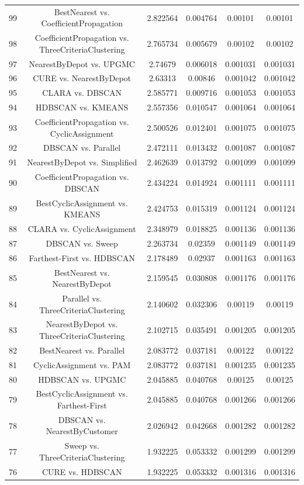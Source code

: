 \documentclass[a4paper,10pt]{article}
\begin{document}
\begin{landscape}
\begin{table}[!htp]
\begin{tabular}{cccccc}
99&BestNearest vs. CoefficientPropagation&2.822564&0.004764&0.00101&0.00101\\
98&CoefficientPropagation vs. ThreeCriteriaClustering&2.765734&0.005679&0.00102&0.00102\\
97&NearestByDepot vs. UPGMC&2.74679&0.006018&0.001031&0.001031\\
96&CURE vs. NearestByDepot&2.63313&0.00846&0.001042&0.001042\\
95&CLARA vs. DBSCAN&2.585771&0.009716&0.001053&0.001053\\
94&HDBSCAN vs. KMEANS&2.557356&0.010547&0.001064&0.001064\\
93&CoefficientPropagation vs. CyclicAssignment&2.500526&0.012401&0.001075&0.001075\\
92&DBSCAN vs. Parallel&2.472111&0.013432&0.001087&0.001087\\
91&NearestByDepot vs. Simplified&2.462639&0.013792&0.001099&0.001099\\
90&CoefficientPropagation vs. DBSCAN&2.434224&0.014924&0.001111&0.001111\\
89&BestCyclicAssignment vs. KMEANS&2.424753&0.015319&0.001124&0.001124\\
88&CLARA vs. CyclicAssignment&2.348979&0.018825&0.001136&0.001136\\
87&DBSCAN vs. Sweep&2.263734&0.02359&0.001149&0.001149\\
86&Farthest-First vs. HDBSCAN&2.178489&0.02937&0.001163&0.001163\\
85&BestNearest vs. NearestByDepot&2.159545&0.030808&0.001176&0.001176\\
84&Parallel vs. ThreeCriteriaClustering&2.140602&0.032306&0.00119&0.00119\\
83&NearestByDepot vs. ThreeCriteriaClustering&2.102715&0.035491&0.001205&0.001205\\
82&BestNearest vs. Parallel&2.083772&0.037181&0.00122&0.00122\\
81&CyclicAssignment vs. PAM&2.083772&0.037181&0.001235&0.001235\\
80&HDBSCAN vs. UPGMC&2.045885&0.040768&0.00125&0.00125\\
79&BestCyclicAssignment vs. Farthest-First&2.045885&0.040768&0.001266&0.001266\\
78&DBSCAN vs. NearestByCustomer&2.026942&0.042668&0.001282&0.001282\\
77&Sweep vs. ThreeCriteriaClustering&1.932225&0.053332&0.001299&0.001299\\
76&CURE vs. HDBSCAN&1.932225&0.053332&0.001316&0.001316\\

\end{tabular}
\end{table}
\end{landscape}
\end{document}
